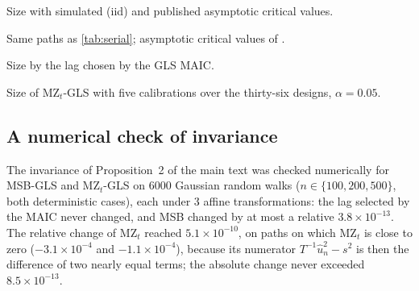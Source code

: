 \documentclass[11pt]{article}
\newcommand{\uhat}{\hat{u}}
\begin{document}
\begin{table}[htbp]
\centering
\caption{Size with simulated (iid) and published asymptotic critical values.}
\label{tab:serialasy}
\small
\begin{adjustbox}{max width=\textwidth}

\end{adjustbox}
\par\medskip\begin{minipage}{\textwidth}\footnotesize Same paths as \cref{tab:serial}; asymptotic critical values of \citet{ng2001lag}.\end{minipage}
\end{table}

\begin{table}[htbp]
\centering
\caption{Size by the lag chosen by the GLS MAIC.}
\label{tab:lag}
\small
\begin{adjustbox}{max width=\textwidth}

\end{adjustbox}
\end{table}

\begin{table}[htbp]
\centering
\caption{Size of MZ$_t$-GLS with five calibrations over the thirty-six designs, $\alpha = 0.05$.}
\label{tab:boot}
\small
\begin{adjustbox}{max width=\textwidth}

\end{adjustbox}
\par\medskip\begin{minipage}{\textwidth}\footnotesize

\end{minipage}
\end{table}

\subsection*{A numerical check of invariance}

The invariance of Proposition~2 of the main text was checked numerically for MSB-GLS and MZ$_t$-GLS on 6000 Gaussian random walks ($n \in \{100, 200, 500\}$, both deterministic cases), each under 3 affine transformations: the lag selected by the MAIC never changed, and MSB changed by at most a relative $3.8\times10^{-13}$. The relative change of MZ$_t$ reached $5.1\times10^{-10}$, on paths on which MZ$_t$ is close to zero ($-3.1\times10^{-4}$ and $-1.1\times10^{-4}$), because its numerator $T^{-1}\uhat_n^2 - s^2$ is then the difference of two nearly equal terms; the absolute change never exceeded $8.5\times10^{-13}$.
\end{document}
